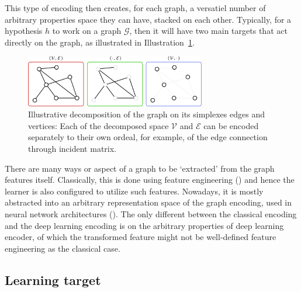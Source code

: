 \documentclass[10pt]{article} %
\begin{document}
This type of encoding then creates, for each graph, a versatiel number of arbitrary properties space they can have, stacked on each other. Typically, for a hypothesis $h$ to work on a graph $\mathcal{G}$, then it will have two main targets that act directly on the graph, as illustrated in Illustration~\ref{fig:graphdecom}.
\begin{figure}[htb]
    \centering
    \includegraphics[width=0.7\textwidth]{img/graphdecom.png}
    \caption{Illustrative decomposition of the graph on its simplexes edges and vertices: Each of the decomposed space $\mathcal{V}$ and $\mathcal{E}$ can be encoded separately to their own ordeal, for example, of the edge connection through incident matrix.}
    \label{fig:graphdecom}
\end{figure}
There are many ways or aspect of a graph to be `extracted' from the graph features itself. Classically, this is done using feature engineering (\cite{GRP_Hamilton}) and hence the learner is also configured to utilize such features. Nowadays, it is mostly abstracted into an arbitrary representation space of the graph encoding, used in neural network architectures (\cite{Oono2020Graph,lopushanskyy2024graphneuralnetworksgraph,Scar04,GRP_Hamilton}). The only different between the classical encoding and the deep learning encoding is on the arbitrary properties of deep learning encoder, of which the transformed feature might not be well-defined feature engineering as the classical case. 

\subsection{Learning target}
\end{document}
